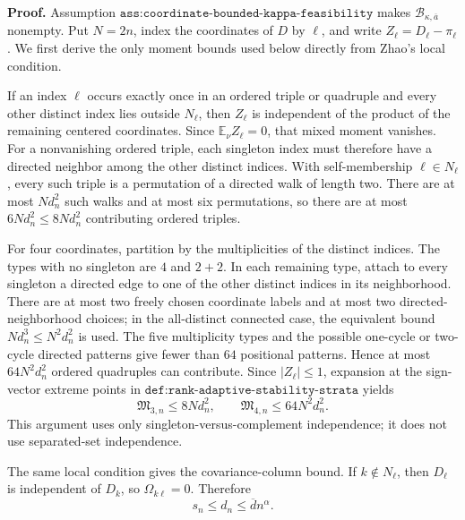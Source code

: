 \textbf{Proof.}
Assumption \(\texttt{ass:coordinate-bounded-kappa-feasibility}\) makes \(\mathcal B_{\kappa,\overline a}\) nonempty.  Put \(N=2n\), index the coordinates of \(D\) by \(\ell\), and write \(Z_\ell=D_\ell-\pi_\ell\).  We first derive the only moment bounds used below directly from Zhao's local condition.

If an index \(\ell\) occurs exactly once in an ordered triple or quadruple and every other distinct index lies outside \(N_\ell\), then \(Z_\ell\) is independent of the product of the remaining centered coordinates.  Since \(\mathbb E_\nu Z_\ell=0\), that mixed moment vanishes.  For a nonvanishing ordered triple, each singleton index must therefore have a directed neighbor among the other distinct indices.  With self-membership \(\ell\in N_\ell\), every such triple is a permutation of a directed walk of length two.  There are at most \(N d_n^2\) such walks and at most six permutations, so there are at most \(6Nd_n^2\le8Nd_n^2\) contributing ordered triples.

For four coordinates, partition by the multiplicities of the distinct indices.  The types with no singleton are \(4\) and \(2+2\).  In each remaining type, attach to every singleton a directed edge to one of the other distinct indices in its neighborhood.  There are at most two freely chosen coordinate labels and at most two directed-neighborhood choices; in the all-distinct connected case, the equivalent bound \(Nd_n^3\le N^2d_n^2\) is used.  The five multiplicity types and the possible one-cycle or two-cycle directed patterns give fewer than \(64\) positional patterns.  Hence at most \(64N^2d_n^2\) ordered quadruples can contribute.  Since \(|Z_\ell|\le1\), expansion at the sign-vector extreme points in \(\texttt{def:rank-adaptive-stability-strata}\) yields
\[
\mathfrak M_{3,n}\le8Nd_n^2,
\qquad
\mathfrak M_{4,n}\le64N^2d_n^2.
\tag{1}
\]
This argument uses only singleton-versus-complement independence; it does not use separated-set independence.

The same local condition gives the covariance-column bound.  If \(k\notin N_\ell\), then \(D_\ell\) is independent of \(D_k\), so \(\Omega_{k\ell}=0\).  Therefore
\[
s_n\le d_n\le\overline d n^\alpha.
\tag{2}
\]

